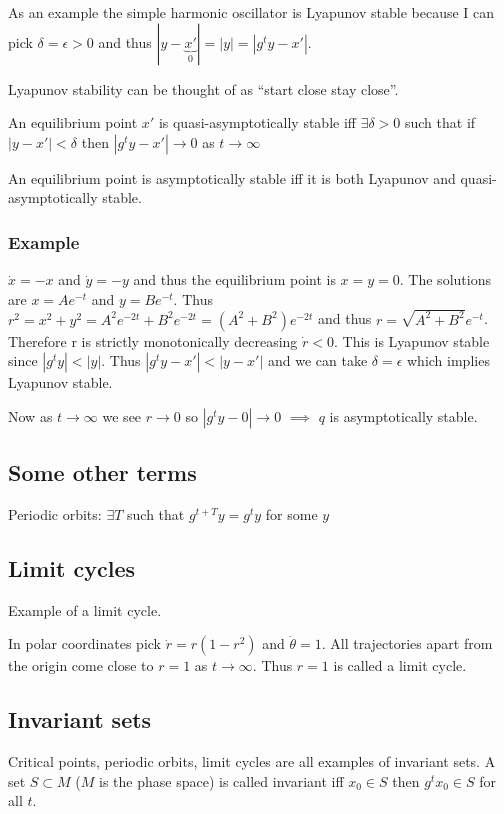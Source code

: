 As an example the simple harmonic oscillator is Lyapunov stable because I can pick $\delta = \epsilon > 0$ and thus $|y-\underbrace{x'}_{0}| = |y| = |g^t y - x'|$.

Lyapunov stability can be thought of as ``start close stay close''.

\vspace{\baselineskip}

An equilibrium point $x'$ is quasi-asymptotically stable iff $\exists \delta > 0$ such that if $|y-x'|<\delta$ then $|g^t y - x'| \rightarrow 0$ as $t \rightarrow \infty$

\vspace{\baselineskip}

An equilibrium point is asymptotically stable iff it is both Lyapunov and quasi-asymptotically stable.

\subsubsection*{Example}

$\dot{x} = -x$ and $\dot{y} = -y$ and thus the equilibrium point is $x=y=0$. The solutions are $x=Ae^{-t}$ and $y = Be^{-t}$. Thus $r^2 = x^2 + y^2 = A^2 e^{-2t} + B^2 e^{-2t} = (A^2 + B^2) e^{-2t}$ and thus $r = \sqrt{A^2 + B^2} e^{-t}$. Therefore r is strictly monotonically decreasing $\dot{r} < 0$. This is Lyapunov stable since $|g^t y| < |y|$. Thus $|g^t y -x'| < |y-x'|$ and we can take $\delta = \epsilon$ which implies Lyapunov stable.

Now as $t \rightarrow \infty$ we see $r \rightarrow 0$ so $|g^t y - 0| \rightarrow 0$ $\implies$ $q$ is asymptotically stable.

\subsection{Some other terms}

Periodic orbits: $\exists T$ such that $g^{t+T} y = g^t y$ for some $y$

\subsection{Limit cycles}

Example of a limit cycle.

In polar coordinates pick $\dot{r} = r(1-r^2)$ and $\dot{\theta} = 1$. All trajectories apart from the origin come close to $r=1$ as $t\rightarrow \infty$. Thus $r=1$ is called a limit cycle.

\subsection{Invariant sets}

Critical points, periodic orbits, limit cycles are all examples of invariant sets. A set $S \subset M$ ($M$ is the phase space) is called invariant iff $x_0 \in S$ then $g^t x_0 \in S$ for all $t$.